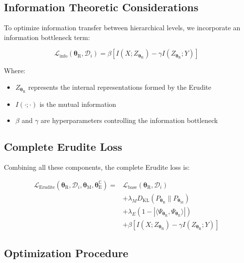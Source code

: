 \subsection{Information Theoretic Considerations}

To optimize information transfer between hierarchical levels, we incorporate an information bottleneck term:

\begin{equation}
\mathcal{L}_{\textrm{info}}(\boldsymbol{\theta}_{\textrm{R}}, \mathcal{D}_i) = \beta [I(X; Z_{\boldsymbol{\theta}_{\textrm{R}}}) - \gamma I(Z_{\boldsymbol{\theta}_{\textrm{R}}}; Y)]
\end{equation}

Where:
\begin{itemize}
    \item $Z_{\boldsymbol{\theta}_{\textrm{R}}}$ represents the internal representations formed by the Erudite
    \item $I(\cdot;\cdot)$ is the mutual information
    \item $\beta$ and $\gamma$ are hyperparameters controlling the information bottleneck
\end{itemize}

\subsection{Complete Erudite Loss}

Combining all these components, the complete Erudite loss is:

\begin{align}
\mathcal{L}_{\textrm{Erudite}}(\boldsymbol{\theta}_{\textrm{R}}, \mathcal{D}_i, \boldsymbol{\theta}_{\textrm{M}}, \boldsymbol{\theta}_{\textrm{E}}^{\mathbb{C}}) = &\mathcal{L}_{\textrm{base}}(\boldsymbol{\theta}_{\textrm{R}}, \mathcal{D}_i) \\
&+ \lambda_M D_{\textrm{KL}}(P_{\boldsymbol{\theta}_{\textrm{R}}} \| P_{\boldsymbol{\theta}_{\textrm{M}}}) \\
&+ \lambda_E (1 - |\langle \Psi_{\boldsymbol{\theta}_{\textrm{R}}}, \Psi_{\boldsymbol{\theta}_{\textrm{E}}} \rangle|) \\
&+ \beta [I(X; Z_{\boldsymbol{\theta}_{\textrm{R}}}) - \gamma I(Z_{\boldsymbol{\theta}_{\textrm{R}}}; Y)]
\end{align}

\subsection{Optimization Procedure}

